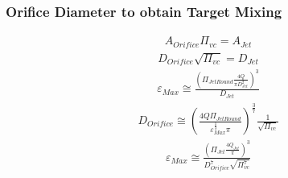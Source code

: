 \documentclass[letterpaper,10pt,english]{sphinxmanual}
\begin{document}
\subsubsection{Orifice Diameter to obtain Target Mixing}
\label{\detokenize{Rapid_Mix/RM_Design:orifice-diameter-to-obtain-target-mixing}}\begin{equation}\label{equation:Rapid_Mix/RM_Design:Rapid_Mix/RM_Design:0}
\begin{split}A_{Orifice} \Pi_{vc} = A_{Jet}\end{split}
\end{equation}\begin{equation}\label{equation:Rapid_Mix/RM_Design:Rapid_Mix/RM_Design:1}
\begin{split}D_{Orifice} \sqrt{\Pi_{vc}} = D_{Jet}\end{split}
\end{equation}\begin{equation}\label{equation:Rapid_Mix/RM_Design:Rapid_Mix/RM_Design:2}
\begin{split}\varepsilon_{Max} \cong \frac{ \left( \Pi_{JetRound} \frac{4Q}{\pi D_{Jet}^2} \right)^3}{D_{Jet}}\end{split}
\end{equation}\begin{equation}\label{equation:Rapid_Mix/RM_Design:Rapid_Mix/RM_Design:3}
\begin{split}D_{Orifice} \cong \left( \frac{4 Q \Pi_{JetRound}}{\varepsilon_{Max}^{\frac{1}{3}} \pi} \right)^{\frac{3}{7}} \frac{1}{\sqrt{\Pi_{vc} }}\end{split}
\end{equation}
\begin{equation}\label{equation:Rapid_Mix/RM_Design:Rapid_Mix/RM_Design:4}
\begin{split}\varepsilon_{Max} \cong  \frac{ \left( \Pi_{Jet} \frac{4 Q_{Jet}}{\pi} \right)^3 }{D_{Orifice}^7 \sqrt{\Pi_{vc}^7} }\end{split}
\end{equation}
\end{document}
